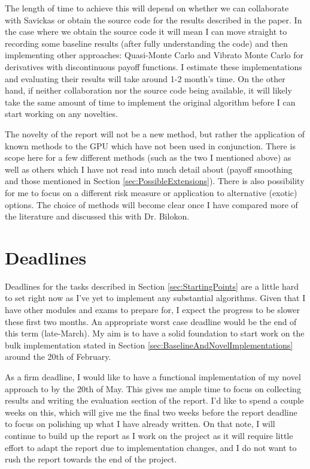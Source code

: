 The length of time to achieve this will depend on whether we can collaborate with Savickas or obtain the source code for the results described in the paper. In the case where we obtain the source code it will mean I can move straight to recording some baseline results (after fully understanding the code) and then implementing other approaches: Quasi-Monte Carlo and Vibrato Monte Carlo for derivatives with discontinuous payoff functions. I estimate these implementations and evaluating their results will take around 1-2 month's time. On the other hand, if neither collaboration nor the source code being available, it will likely take the same amount of time to implement the original algorithm before I can start working on any novelties.

The novelty of the report will not be a new method, but rather the application of known methods to the GPU which have not been used in conjunction. There is scope here for a few different methods (such as the two I mentioned above) as well as others which I have not read into much detail about (payoff smoothing and those mentioned in Section \ref{sec:PossibleExtensions}). There is also possibility for me to focus on a different risk measure or application to alternative (exotic) options. The choice of methods will become clear once I have compared more of the literature and discussed this with Dr. Bilokon.

\section{Deadlines}
Deadlines for the tasks described in Section \ref{sec:StartingPoints} are a little hard to set right now as I've yet to implement any substantial algorithms. Given that I have other modules and exams to prepare for, I expect the progress to be slower these first two months. An appropriate worst case deadline would be the end of this term (late-March). My aim is to have a solid foundation to start work on the bulk implementation stated in Section \ref{sec:BaselineAndNovelImplementations} around the 20th of February.

As a firm deadline, I would like to have a functional implementation of my novel approach to \cite{savickas2014super} by the 20th of May. This gives me ample time to focus on collecting results and writing the evaluation section of the report. I'd like to spend a couple weeks on this, which will give me the final two weeks before the report deadline to focus on polishing up what I have already written. On that note, I will continue to build up the report as I work on the project as it will require little effort to adapt the report due to implementation changes, and I do not want to rush the report towards the end of the project.

